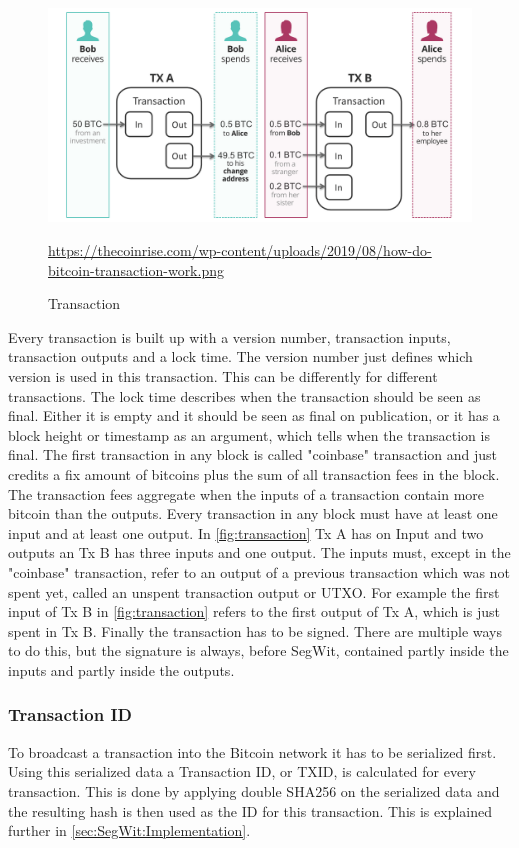 \begin{figure}[!ht]
    \centering
    \includegraphics[width=(\textwidth * 2 / 3 )]{Ausarbeitung/images/transaction.png} \caption[Transaction]{Transaction}
    \small \url{https://thecoinrise.com/wp-content/uploads/2019/08/how-do-bitcoin-transaction-work.png}
    \label{fig:transaction}
\end{figure}
Every transaction is built up with a version number, transaction inputs, transaction outputs and a lock time.
The version number just defines which version is used in this transaction. This can be differently for different transactions.
The lock time describes when the transaction should be seen as final. Either it is empty and it should be seen as final on publication, or it has a block height or timestamp as an argument, which tells when the transaction is final.
The first transaction in any block is called "coinbase" transaction and just credits a fix amount of bitcoins plus the sum of all transaction fees in the block. The transaction fees aggregate when the inputs of a transaction contain more bitcoin than the outputs.
Every transaction in any block must have at least one input and at least one output. In \autoref{fig:transaction} Tx A has on Input and two outputs an Tx B has three inputs and one output. The inputs must, except in the "coinbase" transaction, refer to an output of a previous transaction which was not spent yet, called an unspent transaction output or UTXO. For example the first input of Tx B in \autoref{fig:transaction} refers to the first output of Tx A, which is just spent in Tx B.
Finally the transaction has to be signed. There are multiple ways to do this, but the signature is always, before SegWit, contained partly inside the inputs and partly inside the outputs.

\subsubsection{Transaction ID}
To broadcast a transaction into the Bitcoin network it has to be serialized first. Using this serialized data a Transaction ID, or TXID, is calculated for every transaction. This is done by applying double SHA256 on the serialized data and the resulting hash is then used as the ID for this transaction. This is explained further in \autoref{sec:SegWit:Implementation}.


